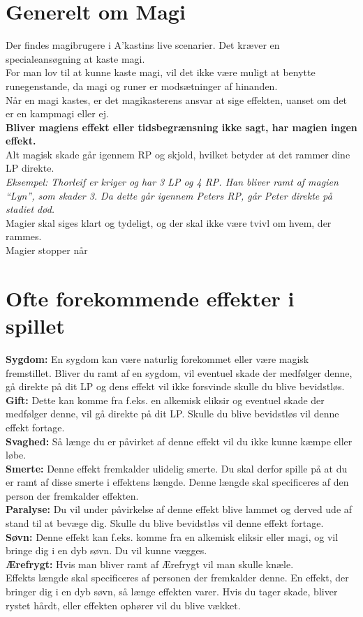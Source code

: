 \section{Generelt om Magi}
Der findes magibrugere i A’kastins live scenarier. Det kræver en specialeansøgning at kaste magi.\\
For man lov til at kunne kaste magi, vil det ikke være muligt at benytte runegenstande, da magi og runer er modsætninger af hinanden.\\
Når en magi kastes, er det magikasterens ansvar at sige effekten, uanset om det er en kampmagi eller ej.\\ 
\textbf{Bliver magiens effekt eller tidsbegrænsning ikke sagt, har magien ingen effekt.}\\
Alt magisk skade går igennem RP og skjold, hvilket betyder at det rammer dine LP direkte.\\
\textit{Eksempel: Thorleif er kriger og har 3 LP og 4 RP. Han bliver ramt af magien “Lyn”, som skader 3. Da dette går igennem Peters RP, går Peter direkte på stadiet død.}\\
Magier skal siges klart og tydeligt, og der skal ikke være tvivl om hvem, der rammes.\\

Magier stopper når 


\section{Ofte forekommende effekter i spillet}
\textbf{Sygdom:} En sygdom kan være naturlig forekommet eller være magisk fremstillet. Bliver du ramt af en sygdom, vil eventuel skade der medfølger denne, gå direkte på dit LP og dens effekt vil ikke forsvinde skulle du blive bevidstløs.\\
\textbf{Gift:} Dette kan komme fra f.eks. en alkemisk eliksir og eventuel skade der medfølger denne, vil gå direkte på dit LP. Skulle du blive bevidstløs vil denne effekt fortage.\\
\textbf{Svaghed:} Så længe du er påvirket af denne effekt vil du ikke kunne kæmpe eller løbe.\\
\textbf{Smerte:} Denne effekt fremkalder ulidelig smerte. Du skal derfor spille på at du er ramt af disse smerte i effektens længde. Denne længde skal specificeres af den person der fremkalder effekten.\\
\textbf{Paralyse:} Du vil under påvirkelse af denne effekt blive lammet og derved ude af stand til at bevæge dig. Skulle du blive bevidstløs vil denne effekt fortage.\\
\textbf{Søvn:} Denne effekt kan f.eks. komme fra en alkemisk eliksir eller magi, og vil bringe dig i en dyb søvn. Du vil kunne vægges.\\
\textbf{Ærefrygt:} Hvis man bliver ramt af Ærefrygt vil man skulle knæle.\\
Effekts længde skal specificeres af personen der fremkalder denne.
En effekt, der bringer dig i en dyb søvn, så længe effekten varer. Hvis du tager skade, bliver rystet hårdt, eller effekten ophører vil du blive vækket.\\